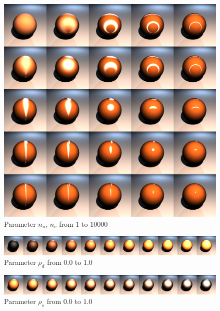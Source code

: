 \documentclass[11pt]{beamer}
\begin{document}
\begin{frame}[allowframebreaks]
\begin{figure}[H]
\includegraphics[height=0.8\textheight]{../ashuvcomplete.png}
\caption{Parameter $n_u$, $n_v$ from $1$ to $10000$}
\end{figure}

\framebreak

\begin{figure}[H]

\includegraphics[width=\textwidth]{../ashdiffcomplete.png}
\caption{Parameter $\rho_d$ from $0.0$ to $1.0$}
\end{figure}

\begin{figure}[H]

\includegraphics[width=\textwidth]{../ashspeccomplete.png}
\caption{Parameter $\rho_s$ from $0.0$ to $1.0$}
\end{figure}

\end{frame}
\end{document}
